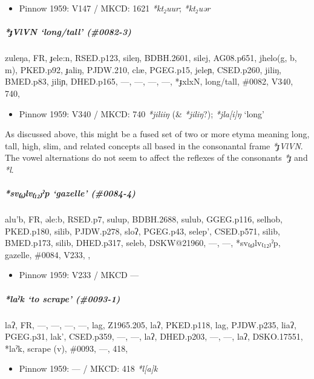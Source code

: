 \documentclass[a4paper,]{article}
\providecommand{\tightlist}{%
  \setlength{\itemsep}{0pt}\setlength{\parskip}{0pt}}
\let\oldsubparagraph\subparagraph
\renewcommand{\subparagraph}[1]{\oldsubparagraph{#1}\mbox{}}
\begin{document}
\begin{itemize}
\tightlist
\item
  Pinnow 1959: V147 / MKCD: 1621 \emph{*kt₂uur}; \emph{*kt₂uər}
\end{itemize}

\subparagraph{\texorpdfstring{\emph{*ɟVlVN} `long/tall'
(\#0082-3)}{*ɟVlVN long/tall (\#0082-3)}}\label{ux25fvlvn-longtall-0082-3}

zuleŋa, FR, ɟele:n, RSED.p123, sileŋ, BDBH.2601, silej, AG08.p651,
jhelo(g, b, m), PKED.p92, ɟaliŋ, PJDW.210, clæ, PGEG.p15, jeleɲ,
CSED.p260, jiliŋ, BMED.p83, jiliɲ, DHED.p165, ---, ---, ---, ---,
*ɟxlxN, long/tall, \#0082, V340, 740,

\begin{itemize}
\tightlist
\item
  Pinnow 1959: V340 / MKCD: 740 \emph{*jiliiŋ} (\& \emph{*jiliŋ}?);
  \emph{*jla{[}i{]}ŋ} `long'
\end{itemize}

As discussed above, this might be a fused set of two or more etyma
meaning long, tall, high, slim, and related concepts all based in the
consonantal frame \emph{*ɟVlVN}. The vowel alternations do not seem to
affect the reflexes of the consonants \emph{*ɟ} and \emph{*l}.

\subparagraph{\texorpdfstring{\emph{*sv₍₆₎lv₍₁₂₎ˀp} `gazelle'
(\#0084-4)}{*sv₍₆₎lv₍₁₂₎ˀp gazelle (\#0084-4)}}\label{svlvux2c0p-gazelle-0084-4}

alu'b, FR, əle:b, RSED.p7, sulup, BDBH.2688, sulub, GGEG.p116, selhob,
PKED.p180, silib, PJDW.p278, sloʔ, PGEG.p43, selep', CSED.p571, silib,
BMED.p173, silib, DHED.p317, seleb, DSKW@21960, ---, ---,
*sv₍₆₎lv₍₁₂₎ˀp, gazelle, \#0084, V233, ,

\begin{itemize}
\tightlist
\item
  Pinnow 1959: V233 / MKCD ---
\end{itemize}

\subparagraph{\texorpdfstring{\emph{*laˀk} `to scrape'
(\#0093-1)}{*laˀk to scrape (\#0093-1)}}\label{laux2c0k-to-scrape-0093-1}

laʔ, FR, ---, ---, ---, ---, lag, Z1965.205, laʔ, PKED.p118, lag,
PJDW.p235, liaʔ, PGEG.p31, lak', CSED.p359, ---, ---, laʔ, DHED.p203,
---, ---, laʔ, DSKO.17551, *laˀk, scrape (v), \#0093, ---, 418,

\begin{itemize}
\tightlist
\item
  Pinnow 1959: --- / MKCD: 418 \emph{*l{[}a{]}k}
\end{itemize}
\end{document}
